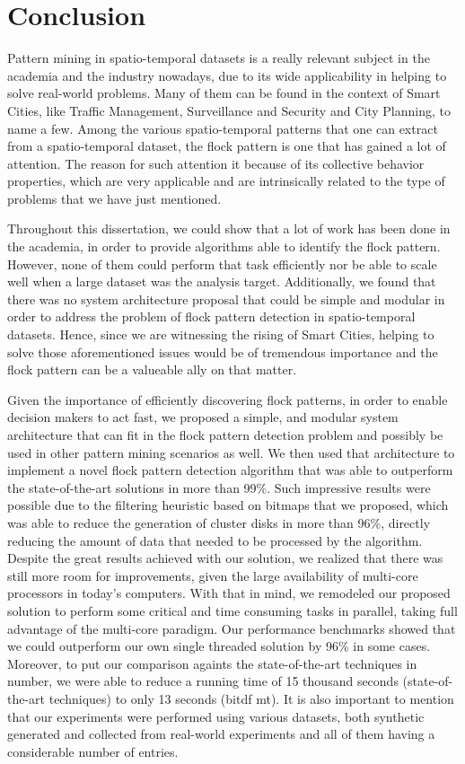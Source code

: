 \chapter{Conclusion}
\label{chp:conclusion}
Pattern mining in spatio-temporal datasets is a really relevant subject in the academia and the industry nowadays, due
to its wide applicability in helping to solve real-world problems. Many of them can be found in the context of Smart
Cities, like Traffic Management, Surveillance and Security and City Planning, to name a few. Among the various
spatio-temporal patterns that one can extract from a spatio-temporal dataset, the flock pattern is one that has gained a
lot of attention. The reason for such attention it because of its collective behavior properties, which are very
applicable and are intrinsically related to the type of problems that we have just mentioned.

Throughout this dissertation, we could show that a lot of work has been done in the academia, in order to provide
algorithms able to identify the flock pattern. However, none of them could perform that task efficiently nor be able to
scale well when a large dataset was the analysis target. Additionally, we found that there was no system architecture
proposal that could be simple and modular in order to address the problem of flock pattern detection in spatio-temporal
datasets. Hence, since we are witnessing the rising of Smart Cities, helping to solve those aforementioned issues would
be of tremendous importance and the flock pattern can be a valueable ally on that matter.

Given the importance of efficiently discovering flock patterns, in order to enable decision makers to act fast, we
proposed a simple, and modular system architecture that can fit in the flock pattern detection problem and possibly be
used in other pattern mining scenarios as well. We then used that architecture to implement a novel flock pattern
detection algorithm that was able to outperform the state-of-the-art solutions in more than 99\%. Such impressive
results were possible due to the filtering heuristic based on bitmaps that we proposed, which was able to reduce the
generation of cluster disks in more than 96\%, directly reducing the amount of data that needed to be processed by the
algorithm. Despite the great results achieved with our solution, we realized that there was still more room for
improvements, given the large availability of multi-core processors in today's computers. With that in mind, we
remodeled our proposed solution to perform some critical and time consuming tasks in parallel, taking full advantage of
the multi-core paradigm. Our performance benchmarks showed that we could outperform our own single threaded solution by
96\% in some cases. Moreover, to put our comparison againts the state-of-the-art techniques in number, we were able to
reduce a running time of 15 thousand seconds (state-of-the-art techniques) to only 13 seconds (\ac{bitdf} \ac{mt}). It
is also important to mention that our experiments were performed using various datasets, both synthetic generated and
collected from real-world experiments and all of them having a considerable number of entries.

